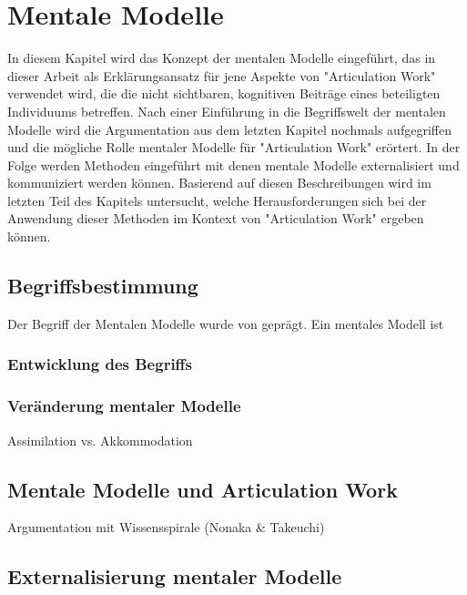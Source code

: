 \chapter{Mentale Modelle}
\label{cha:mentale_modelle}

In diesem Kapitel wird das Konzept der mentalen Modelle eingeführt, das in dieser Arbeit als Erklärungsansatz für jene Aspekte von "Articulation Work" verwendet wird, die die nicht sichtbaren, kognitiven Beiträge eines beteiligten Individuums betreffen. Nach einer Einführung in die Begriffswelt der mentalen Modelle wird die Argumentation aus dem letzten Kapitel nochmals aufgegriffen und die mögliche Rolle mentaler Modelle für "Articulation Work" erörtert. In der Folge werden Methoden eingeführt mit denen mentale Modelle externalisiert und kommuniziert werden können. Basierend auf diesen Beschreibungen wird im letzten Teil des Kapitels untersucht, welche Herausforderungen sich bei der Anwendung dieser Methoden im Kontext von "Articulation Work" ergeben können.

\section{Begriffsbestimmung}
\label{sec:mentalemodelle_begriffsbestimmung}

Der Begriff der Mentalen Modelle wurde von \citet{Johnson-Laird81} geprägt. Ein mentales Modell ist 

\subsection{Entwicklung des Begriffs}
\label{sub:entwicklung_des_begriffs}

\subsection{Veränderung mentaler Modelle}
\label{sub:veränderung_mentaler_modelle}
Assimilation vs. Akkommodation

\section{Mentale Modelle und Articulation Work}
\label{sec:mentale_modelle_und_articulation_work}

Argumentation mit Wissensspirale (Nonaka \& Takeuchi)

\section{Externalisierung mentaler Modelle}
\label{sec:methoden_zur_externalisierung_mentaler_modelle}

